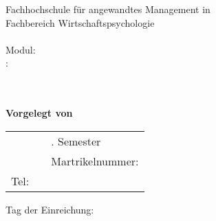 \begin{titlepage}
	\noindent
	Fachhochschule für angewandtes Management in \myCampus\\
	Fachbereich Wirtschaftspsychologie\\
	\mySemDate \\%
	Modul: \myModul \\%
	\myDozTitle: \myDoz \\%
	\begin{center}
		\vspace*{2cm}
		\LARGE\bf\myTopic\\
		\Large\rm\mySubTopic\\
		\vspace*{2cm}
		Vorgelegt von \myAutor\\
		\vspace*{3cm}
	\end{center}
	
	\noindent
	\begin{tabularx}{\linewidth}{lXl}
		\myStreet             				&& \mySemester. Semester 								\\
		\myCity 	  						 && Martrikelnummer: \myMarikelnummer      		\\
		Tel: \myTel           				 &&																		\\
	\end{tabularx} 
	\vspace*{2cm}
	\begin{center}
		Tag der Einreichung:\\ \myEndDate\\
	\end{center}
\end{titlepage}
\newpage
\setcounter{page}{2}